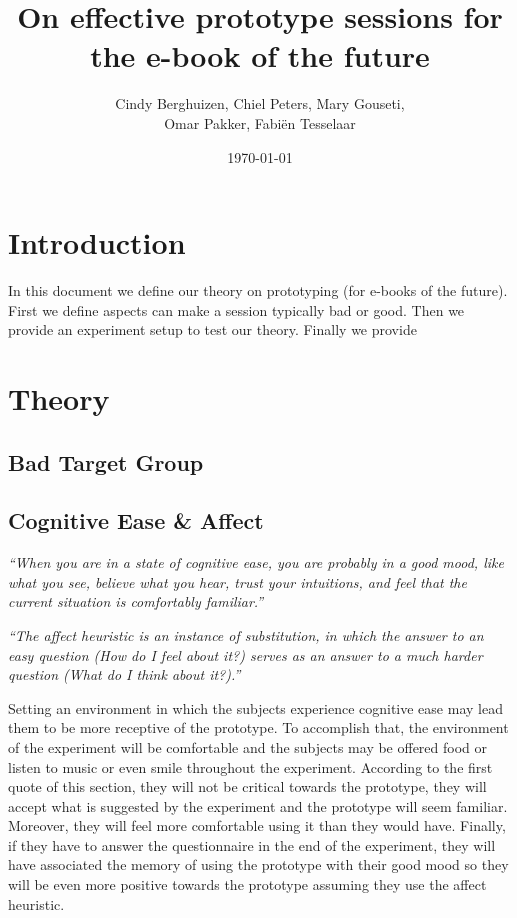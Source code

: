 \documentclass{article}
\title{On effective prototype sessions for the e-book of the future}
\author{Cindy Berghuizen, Chiel Peters, Mary Gouseti,\\ Omar Pakker, Fabi\"en Tesselaar}
\date{\today}
\begin{document}
\maketitle

\tableofcontents

\section{Introduction}

In this document we define our theory on prototyping (for e-books of the future).
First we define aspects can make a session typically bad or good. 
Then we provide an experiment setup to test our theory. Finally we provide 

\section{Theory}

\subsection{Bad Target Group}
\subsection{Cognitive Ease \& Affect}
\emph{``When you are in a state of cognitive ease, you are probably in a good mood, like what you see, believe what you hear, trust your intuitions, and feel that the current situation is comfortably familiar.''}

\emph{``The affect heuristic is an instance of substitution, in which the answer to an easy question (How do I feel about it?) serves as an answer to a much harder question (What do I think about it?).''}

Setting an environment in which the subjects experience cognitive ease may lead them to be more receptive of the prototype. To accomplish that, the environment of the experiment will be comfortable and the subjects may be offered food or listen to music or even smile throughout the experiment. According to the first quote of this section, they will not be critical towards the prototype, they will accept what is suggested by the experiment and the prototype will seem familiar. Moreover, they will feel more comfortable using it than they would have. Finally, if they have to answer the questionnaire in the end of the experiment, they will have associated the memory of using the prototype with their good mood so they will be even more positive towards the prototype assuming they use the affect heuristic.
\end{document}
